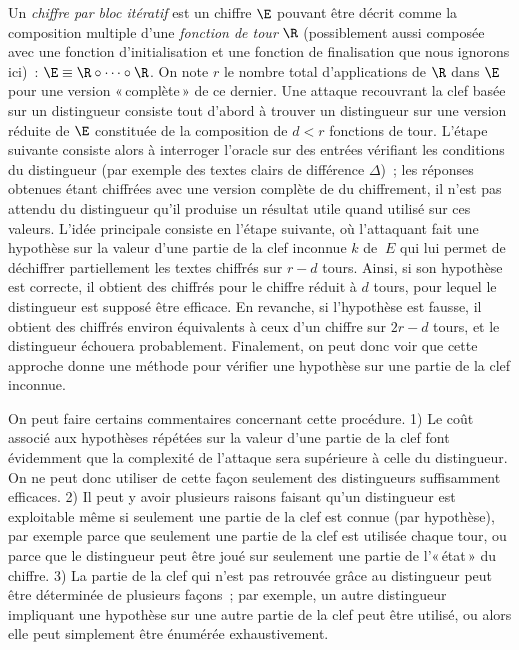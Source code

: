 Un  \emph{chiffre par bloc itératif} est un chiffre $\E$ pouvant être décrit comme la composition multiple
d'une \emph{fonction de tour} $\R$ (possiblement aussi composée avec une fonction d'initialisation et une fonction de finalisation
que nous ignorons ici)~:
$\E \equiv \R \circ \cdots \circ \R$. On note $r$ le nombre total d'applications de $\R$ dans $\E$ pour une version «\,complète\,» de ce dernier.
Une attaque recouvrant la clef basée sur un distingueur consiste tout d'abord à trouver un distingueur sur une version
réduite de $\E$ constituée de la composition de $d < r$ fonctions de tour. L'étape suivante consiste alors à interroger l'oracle sur
des entrées vérifiant les conditions du distingueur (par exemple des textes clairs de différence $\Delta$)~; les réponses obtenues étant chiffrées
avec une version complète de du chiffrement, il n'est pas attendu du distingueur qu'il produise un résultat utile quand utilisé sur ces valeurs.
L'idée principale consiste en l'étape suivante, où l'attaquant fait une hypothèse sur la valeur d'une partie de la clef inconnue $k$ de $\:E$
qui lui permet de déchiffrer partiellement les textes chiffrés sur $r-d$ tours. Ainsi, si son hypothèse est correcte, il obtient des chiffrés pour le
chiffre réduit à $d$ tours, pour lequel le distingueur est supposé être efficace. En revanche, si l'hypothèse est fausse,
il obtient des chiffrés environ équivalents à ceux d'un chiffre sur $2r - d$ tours, et le distingueur échouera probablement. Finalement, on peut donc
voir que cette approche donne une méthode pour vérifier une hypothèse sur une partie de la clef inconnue. 

On peut faire certains commentaires concernant cette procédure. 1) Le coût associé aux hypothèses répétées sur la valeur d'une partie de la clef
font évidemment que la complexité de l'attaque sera supérieure à celle du distingueur. On ne peut donc utiliser de cette façon seulement des distingueurs suffisamment
efficaces. 2) Il peut y avoir plusieurs raisons faisant qu'un distingueur est exploitable même si seulement une partie de la clef est connue (par hypothèse), par exemple
parce que seulement une partie de la clef est utilisée chaque tour, ou parce que le distingueur peut être joué sur seulement une partie de l'«\,état\,» du chiffre.
3) La partie de la clef qui n'est pas retrouvée grâce au distingueur peut être déterminée de plusieurs façons~; par exemple, un autre distingueur
impliquant une hypothèse sur une autre partie de la clef peut être utilisé, ou alors elle peut simplement être énumérée exhaustivement.



